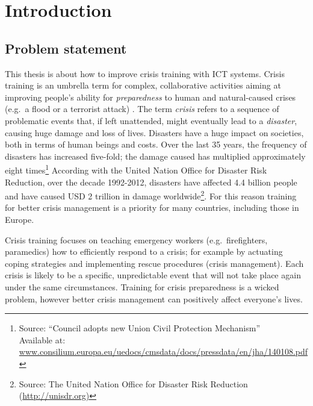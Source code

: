 \mainmatter

\chapter{Introduction}\label{introduction}

\section{Problem statement}\label{problem-statement}

This thesis is about how to improve crisis training with ICT systems. Crisis training is an umbrella term for complex, collaborative activities aiming at improving people's ability for \emph{preparedness} to human and natural-caused crises (e.g.~a flood or a terrorist attack) \autocite{Lagadec:1997js}. The term \emph{crisis} refers to a sequence of problematic events that, if left unattended, might eventually lead to a \emph{disaster}, causing huge damage and loss of lives. Disasters have a huge impact on societies, both in terms of human beings and costs. Over the last 35 years, the frequency of disasters has increased five-fold; the damage caused has multiplied approximately eight times\footnote{Source: ``Council adopts new Union Civil Protection Mechanism'' \\ Available at: \url{www.consilium.europa.eu/uedocs/cmsdata/docs/pressdata/en/jha/140108.pdf}} According with the United Nation Office for Disaster Risk Reduction, over the decade 1992-2012, disasters have affected 4.4 billion people and have caused USD 2 trillion in damage worldwide\footnote{Source: The United Nation Office for Disaster Risk Reduction (\url{http://unisdr.org)}}. For this reason training for better crisis management is a priority for many countries, including those in Europe.

Crisis training focuses on teaching emergency workers (e.g.~firefighters, paramedics) how to efficiently respond to a crisis; for example by actuating coping strategies and implementing rescue procedures (crisis management). Each crisis is likely to be a specific, unpredictable event that will not take place again under the same circumstances. Training for crisis preparedness is a wicked problem, however better crisis management can positively affect everyone's lives.

